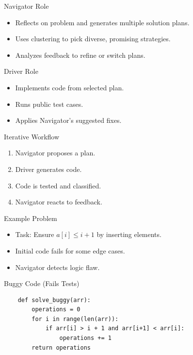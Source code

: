 \documentclass{beamer}
\begin{document}
	\begin{frame}{Navigator Role}
	  \begin{itemize}
	    \item Reflects on problem and generates multiple solution plans.
	    \item Uses clustering to pick diverse, promising strategies.
	    \item Analyzes feedback to refine or switch plans.
	  \end{itemize}
	\end{frame}
	
	\begin{frame}{Driver Role}
	  \begin{itemize}
	    \item Implements code from selected plan.
	    \item Runs public test cases.
	    \item Applies Navigator's suggested fixes.
	  \end{itemize}
	\end{frame}
	
	\begin{frame}{Iterative Workflow}
	  \begin{enumerate}
	    \item Navigator proposes a plan.
	    \item Driver generates code.
	    \item Code is tested and classified.
	    \item Navigator reacts to feedback.
	  \end{enumerate}
	\end{frame}
	
	\begin{frame}{Example Problem}
	  \begin{itemize}
	    \item Task: Ensure $a[i] \leq i+1$ by inserting elements.
	    \item Initial code fails for some edge cases.
	    \item Navigator detects logic flaw.
	  \end{itemize}
	\end{frame}
	

	
	
	
	\begin{frame}[fragile]{Buggy Code (Fails Tests)}
	\scriptsize
	\begin{verbatim}
	def solve_buggy(arr):
	    operations = 0
	    for i in range(len(arr)):
	        if arr[i] > i + 1 and arr[i+1] < arr[i]:
	            operations += 1
	    return operations
	\end{verbatim}
	\end{frame}
	
\end{document}
